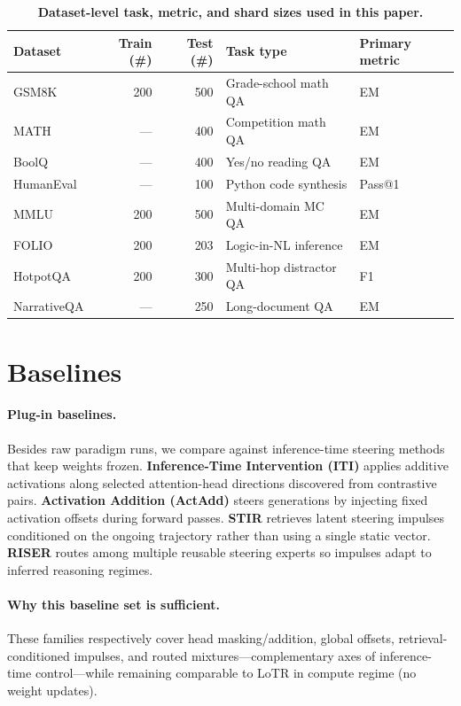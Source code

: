 \begin{table}[!b]
\centering
\caption{\textbf{Dataset-level task, metric, and shard sizes used in this paper.}}
\label{tab:app_dataset_metric_map}
\footnotesize
\setlength{\tabcolsep}{4pt}
\renewcommand{\arraystretch}{1.06}
\begin{tabular}{@{}lrrll@{}}
\toprule
\textbf{Dataset} & \textbf{Train (\#)} & \textbf{Test (\#)} & \textbf{Task type} & \textbf{Primary metric} \\
\midrule
GSM8K & 200 & 500 & Grade-school math QA & EM \\
MATH & --- & 400 & Competition math QA & EM \\
BoolQ & --- & 400 & Yes/no reading QA & EM \\
HumanEval & --- & 100 & Python code synthesis & Pass@1 \\
MMLU & 200 & 500 & Multi-domain MC QA & EM \\
FOLIO & 200 & 203 & Logic-in-NL inference & EM \\
HotpotQA & 200 & 300 & Multi-hop distractor QA & F1 \\
NarrativeQA & --- & 250 & Long-document QA & EM \\
\bottomrule
\end{tabular}
\end{table}

\section{Baselines}
\label{app:baselines}

\paragraph{Plug-in baselines.}
Besides raw paradigm runs, we compare against inference-time steering methods that keep weights frozen.
\textbf{Inference-Time Intervention (ITI)} \citep{li2023inference} applies additive activations along selected attention-head directions discovered from contrastive pairs.
\textbf{Activation Addition (ActAdd)} \citep{turner2024actadd} steers generations by injecting fixed activation offsets during forward passes.
\textbf{STIR} \citep{shi2026stir} retrieves latent steering impulses conditioned on the ongoing trajectory rather than using a single static vector.
\textbf{RISER} \citep{ye2026riser} routes among multiple reusable steering experts so impulses adapt to inferred reasoning regimes.

\paragraph{Why this baseline set is sufficient.}
These families respectively cover head masking/addition, global offsets, retrieval-conditioned impulses, and routed mixtures---complementary axes of inference-time control---while remaining comparable to LoTR in compute regime (no weight updates).


